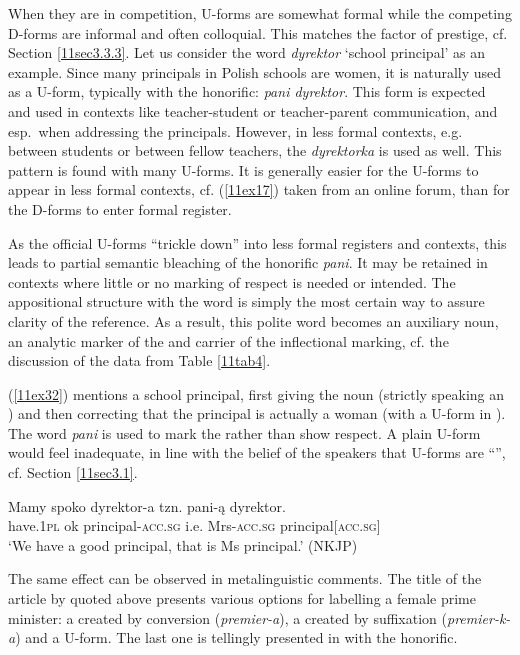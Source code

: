 \documentclass[output=paper,colorlinks,citecolor=brown]{langscibook}
\begin{document}
When they are in competition, U-forms are somewhat formal while the competing D-forms are informal and often colloquial. This matches the factor of prestige, cf. Section \ref{11sec3.3.3}. Let us consider the word \emph{dyrektor} `school principal' as an example. Since many principals in Polish schools are women, it is naturally used as a U-form, typically with the honorific: \emph{pani dyrektor}. This form is expected and used in contexts like teacher-student or teacher-parent communication, and esp.~when addressing the principals. However, in less formal contexts, e.g. between students or between fellow teachers, the  \emph{dyrektorka} is used as well. This pattern is found with many U-forms. It is generally easier for the U-forms to appear in less formal contexts, cf. (\ref{11ex17}) taken from an online forum, than for the D-forms to enter formal register.

As the official U-forms ``trickle down'' into less formal registers and contexts, this leads to partial semantic bleaching of the honorific \emph{pani}. It may be retained in contexts where little or no marking of respect is needed or intended. The appositional structure with the word is simply the most certain way to assure clarity of the  reference. As a result, this polite word becomes an auxiliary noun, an analytic marker of the   and carrier of the inflectional marking, cf. the discussion of the data from Table \ref{11tab4}.

(\ref{11ex32}) mentions a school principal, first giving the  noun (strictly speaking an ) and then correcting that the principal is actually a woman (with a U-form in ). The word \emph{pani} is used to mark the  rather than show respect. A plain U-form would feel inadequate, in line with the belief of the speakers that U-forms are ``'', cf. Section \ref{11sec3.1}.

\begin{exe}
	\ex \label{11ex32}
	\gll Mamy spoko dyrektor-a tzn. pani-ą dyrektor. \\
	have.\textsc{1pl} ok principal-\textsc{acc.sg} i.e. Mrs-\textsc{acc.sg} principal[\textsc{acc.sg}] \\
	\trans ‘We have a good principal, that is Ms principal.’ \hfill (NKJP)
\end{exe}

The same effect can be observed in metalinguistic comments. The title of the article by \citet{szpyra-kozlowska2019} quoted above presents various options for labelling a female prime minister: a  created by conversion (\emph{premier-a}), a  created by suffixation (\emph{premier-k-a}) and a U-form. The last one is tellingly presented in  with the honorific.
\end{document}
